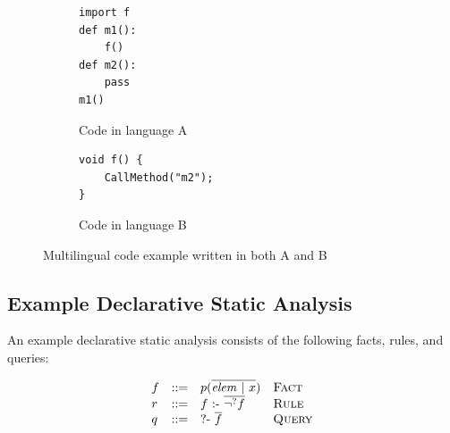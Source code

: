 \begin{figure}[t]
  \centering
  \begin{subfigure}[t]{0.23\textwidth}
    \begin{lstlisting}[style=mpython]
import f
def m1():
    f()
def m2():
    pass
m1()
    \end{lstlisting}
    \vspace*{-.5em}
    \caption{Code in language A}
    \label{fig:exam:langA}
  \end{subfigure}
  \begin{subfigure}[t]{0.23\textwidth}
    \begin{lstlisting}[style=mcpp,firstnumber=7]
void f() {
    CallMethod("m2");
}
    \end{lstlisting}
    \vspace*{2.5em}
    \caption{Code in language B}
    \label{fig:exam:langB}
  \end{subfigure}
  \vspace*{-.5em}
  \caption{Multilingual code example written in both A and B}
  \label{fig:exam}
\end{figure}

%

\subsection{Example Declarative Static Analysis}
An example declarative static analysis consists of the following facts, rules, and queries:

{\small
\[
  \begin{array}{llll}
    f & ::= & p(\overline{\mbox{\textit{elem}}\ |\ x}) & \text{\sc Fact}\\
    r & ::= & f\ \mbox{:-}\ \overline{\neg^? f} & \text{\sc Rule}\\
    q & ::= & \mbox{?-}\ \overline{f}\ &  \text{\sc Query}
\end{array}
\]
}


